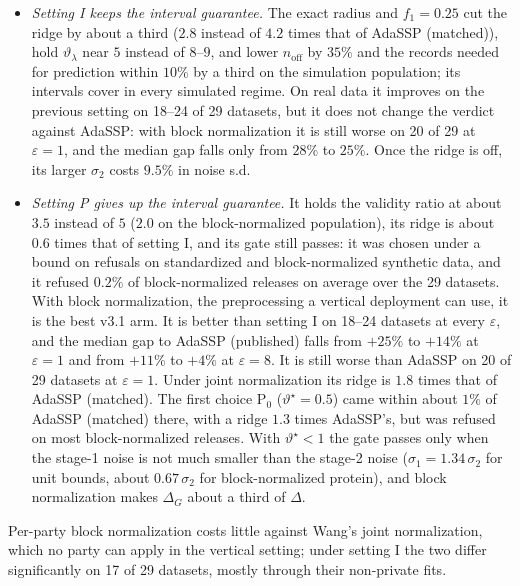 \documentclass[11pt]{article}
\theoremstyle{definition}
\theoremstyle{plain}
\begin{document}
\begin{itemize}[noitemsep]
  \item \emph{Setting I keeps the interval guarantee.} The exact radius and $f_1 = 0.25$ cut the ridge by about a third ($2.8$ instead of $4.2$ times that of AdaSSP (matched)), hold $\vartheta_\lambda$ near $5$ instead of $8$--$9$, and lower $n_{\mathrm{off}}$ by $35\%$ and the records needed for prediction within $10\%$ by a third on the simulation population; its intervals cover in every simulated regime. On real data it improves on the previous setting on 18--24 of 29 datasets, but it does not change the verdict against AdaSSP: with block normalization it is still worse on 20 of 29 at $\varepsilon = 1$, and the median gap falls only from $28\%$ to $25\%$. Once the ridge is off, its larger $\sigma_2$ costs $9.5\%$ in noise s.d.
  \item \emph{Setting P gives up the interval guarantee.} It holds the validity ratio at about $3.5$ instead of $5$ ($2.0$ on the block-normalized population), its ridge is about $0.6$ times that of setting I, and its gate still passes: it was chosen under a bound on refusals on standardized and block-normalized synthetic data, and it refused $0.2\%$ of block-normalized releases on average over the 29 datasets. With block normalization, the preprocessing a vertical deployment can use, it is the best v3.1 arm. It is better than setting I on 18--24 datasets at every $\varepsilon$, and the median gap to AdaSSP (published) falls from $+25\%$ to $+14\%$ at $\varepsilon = 1$ and from $+11\%$ to $+4\%$ at $\varepsilon = 8$. It is still worse than AdaSSP on 20 of 29 datasets at $\varepsilon = 1$. Under joint normalization its ridge is $1.8$ times that of AdaSSP (matched). The first choice P$_0$ ($\vartheta^\star = 0.5$) came within about $1\%$ of AdaSSP (matched) there, with a ridge $1.3$ times AdaSSP's, but was refused on most block-normalized releases. With $\vartheta^\star < 1$ the gate passes only when the stage-1 noise is not much smaller than the stage-2 noise ($\sigma_1 = 1.34\,\sigma_2$ for unit bounds, about $0.67\,\sigma_2$ for block-normalized protein), and block normalization makes $\Delta_G$ about a third of $\Delta$.
\end{itemize}
Per-party block normalization costs little against Wang's joint normalization, which no party can apply in the vertical setting; under setting I the two differ significantly on 17 of 29 datasets, mostly through their non-private fits.
\end{document}
